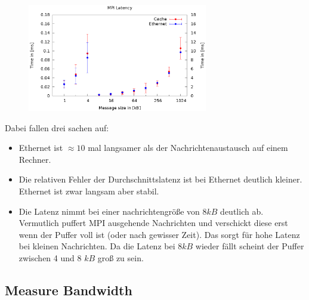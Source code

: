 \documentclass[a4paper,11pt]{scrartcl}
\begin{document}
\begin{figure}[!ht]
\centering
\includegraphics[width=0.7\textwidth,keepaspectratio]{3_3/data/plot.eps}
\end{figure}

Dabei fallen drei sachen auf: 

\begin{itemize}
    \item Ethernet ist $\approx 10$ mal langsamer als der Nachrichtenaustausch auf einem Rechner.
    \item Die relativen Fehler der Durchschnittslatenz ist bei Ethernet deutlich kleiner. Ethernet ist zwar langsam aber stabil.
    \item Die Latenz nimmt bei einer nachrichtengröße von $8kB$ deutlich ab. Vermutlich puffert MPI ausgehende Nachrichten und verschickt diese erst wenn der Puffer voll ist (oder nach gewisser Zeit). Das sorgt für hohe Latenz bei kleinen Nachrichten. Da die Latenz bei $8kB$ wieder fällt scheint der Puffer zwischen 4 und 8 $kB$ groß zu sein.
\end{itemize}





\subsection{Measure Bandwidth}
\end{document}

